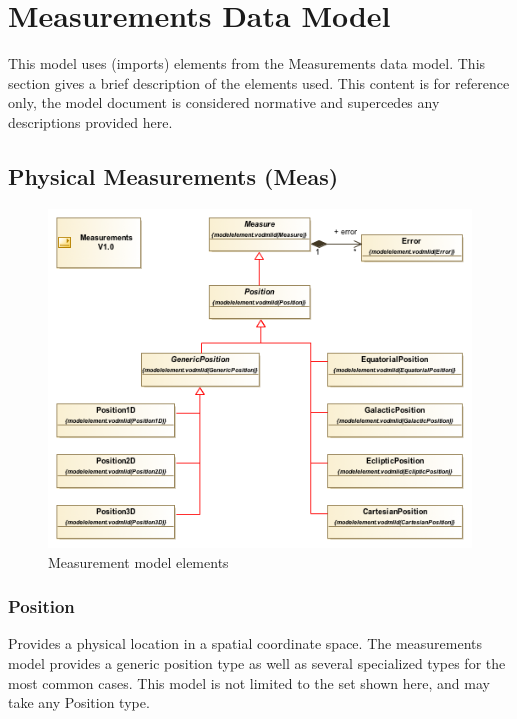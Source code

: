 \pagebreak
\section{Measurements Data Model}
\label{sect:meas}

This model uses (imports) elements from the Measurements data model. This
section gives a brief description of the elements used. This content is for
reference only, the model document is considered normative and supercedes any
descriptions provided here.

\pagebreak
\subsection{Physical Measurements (Meas)}

  \begin{figure}[h]
  \begin{center}
    \includegraphics[width=4.5in]{diagrams/Measurement_elements.png}
    \caption{Measurement model elements}\label{fig:measurements}
  \end{center}
  \end{figure}

  \subsubsection{Position}
  \label{sect:pos}
  Provides a physical location in a spatial coordinate space. The measurements
  model provides a generic position type as well as several specialized types
  for the most common cases. This model is not limited to the set shown here,
  and may take any Position type.

  
